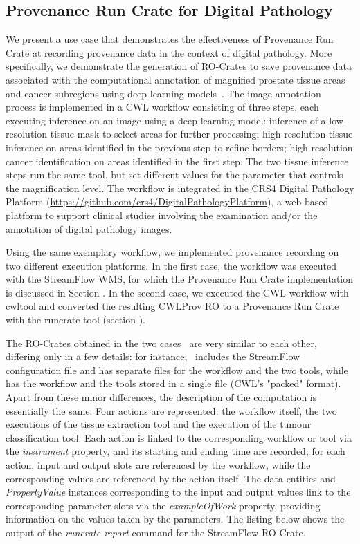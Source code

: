 \documentclass[10pt,letterpaper]{article}
\begin{document}
\subsection{Provenance Run Crate for Digital Pathology}\label{provenance-run-crate-for-digital-pathology}

We present a use case that demonstrates the effectiveness of Provenance Run Crate at recording provenance data in the context of digital pathology.
More specifically, we demonstrate the generation of RO-Crates to save provenance data associated with the computational annotation of magnified prostate tissue areas and cancer subregions using deep learning models~\cite{Del Rio 2022}.
The image annotation process is implemented in a CWL workflow consisting of three steps, each executing inference on an image using a deep learning model: inference of a low-resolution tissue mask to select areas for further processing;
high-resolution tissue inference on areas identified in the previous step to refine borders; high-resolution cancer identification on areas identified in the first step.
The two tissue inference steps run the same tool, but set different values for the parameter that controls the magnification level.
The workflow is integrated in the CRS4 Digital Pathology Platform (\url{https://github.com/crs4/DigitalPathologyPlatform}), a web-based platform to support clinical studies involving the examination and/or the annotation of digital pathology images.

Using the same exemplary workflow, we implemented provenance recording on two different execution platforms.
In the first case, the workflow was executed with the StreamFlow WMS, for which the Provenance Run Crate implementation is discussed in Section .
In the second case, we executed the CWL workflow with cwltool and converted the resulting CWLProv RO to a Provenance Run Crate with the runcrate tool (section ).

The RO-Crates obtained in the two cases~\cite{Colonnelli 2023, Leo 2023b}
are very similar to each other, differing only in a few details: for instance,~\cite{Colonnelli 2023} includes the StreamFlow configuration file and has separate files for the workflow and the two tools, while
\cite{Leo 2023b} has the workflow and the tools stored in a single file (CWL's "packed" format).
Apart from these minor differences, the description of the computation is essentially the same.
Four actions are represented: the workflow itself, the two executions of the tissue extraction tool and the execution of the tumour classification tool.
Each action is linked to the corresponding workflow or tool via the
\emph{instrument} property, and its starting and ending time are recorded; for each action, input and output slots are referenced by the workflow, while the corresponding values are referenced by the action itself.
The data entities and \emph{PropertyValue} instances corresponding to the input and output values link to the corresponding parameter slots via the \emph{exampleOfWork} property, providing information on the values taken by the parameters.
The listing below shows the output of the
\emph{runcrate report} command for the StreamFlow RO-Crate.
\end{document}
